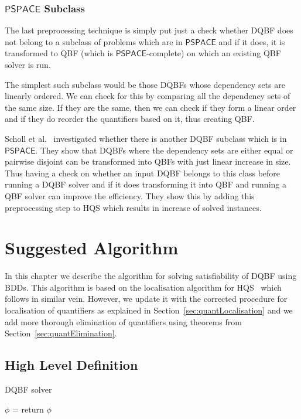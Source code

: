 \documentclass[
  digital, %
  color,
  twoside, %
  table,   %
  nolof,     %
  nolot,     %
]{fithesis3}
\theoremstyle{definition}
\theoremstyle{remark}
\newcommand{\ComplexityFont}[1]{\mathsf{#1}}
\newcommand{\PSPACE}{\ComplexityFont{PSPACE}}
\begin{document}
\subsection{\texorpdfstring{$\PSPACE$}{PSPACE} Subclass}
\label{sec:prepro:pspacesubclass}
The last preprocessing technique is simply put just a check whether DQBF does not belong to a subclass of problems which are in $\PSPACE$ and if it does, it is transformed to QBF (which is $\PSPACE$-complete) on which an existing QBF solver is run.

The simplest such subclass would be those DQBFs whose dependency sets are linearly ordered. We can check for this by comparing all the dependency sets of the same size. If they are the same, then we can check if they form a linear order and if they do reorder the quantifiers based on it, thus creating QBF.

Scholl et al.~\cite{PSPACEsubclass} investigated whether there is another DQBF subclass which is in $\PSPACE$. They show that DQBFs where the dependency sets are either equal or pairwise disjoint can be transformed into QBFs with just linear increase in size. Thus having a check on whether an input DQBF belongs to this class before running a DQBF solver and if it does transforming it into QBF and running a QBF solver can improve the efficiency. They show this by adding this preprocessing step to HQS which results in increase of solved instances.

\chapter{Suggested Algorithm}
\label{chap:algorithm}
In this chapter we describe the algorithm for solving satisfiability of DQBF using BDDs. This algorithm is based on the localisation algorithm for HQS~\cite{HQSquantifierLocalisation} which follows in similar vein. However, we update it with the corrected procedure for localisation of quantifiers as explained in Section~\ref{sec:quantLocalisation} and we add more thorough elimination of quantifiers using theorems from Section~\ref{sec:quantElimination}.

\section{High Level Definition}
\begin{algorithm}
  \caption{DQBF solver}
  \label{alg:general}
  \begin{algorithmic}[1]
    \State {}
    \State $\phi$ = 
    \State {} \label{alg:general:elimination}
    \State return $\phi$
    \EndFunction
  \end{algorithmic}
\end{algorithm}
\end{document}
